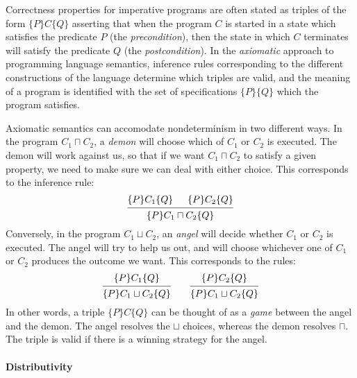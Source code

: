 \documentclass[format=sigplan,authordraft]{acmart}
\newcommand{\htr}[3]{{ \{{#1}\} {#2} \{{#3}\} }}
\begin{document}

Correctness properties for imperative programs
are often stated as triples of the form $\{P\} C \{Q\}$
asserting that
when the program $C$ is started in a state which
satisfies the predicate $P$ (the \emph{precondition}),
then the state in which $C$ terminates
will satisfy the predicate $Q$ (the \emph{postcondition}).
In the \emph{axiomatic} approach to programming language semantics,
inference rules
corresponding to the different constructions of the language
determine which triples are valid,
and the meaning of a program is identified with
the set of specifications $\{P\}\{Q\}$
which the program satisfies.

Axiomatic semantics
can accomodate nondeterminism in two different ways.
In the program $C_1 \sqcap C_2$,
a \emph{demon} will choose which of $C_1$ or $C_2$ is executed.
The demon will work against us,
so that if we want $C_1 \sqcap C_2$ to satisfy a given property,
we need to make sure we can deal with either choice.
This corresponds to the inference rule:
\[
  \begin{prooftree}
    \hypo{\htr{P}{C_1}{Q}}
    \hypo{\htr{P}{C_2}{Q}}
    \infer2{\htr{P}{C_1 \sqcap C_2}{Q}}
  \end{prooftree}
\]
Conversely,
in the program $C_1 \sqcup C_2$,
an \emph{angel} will decide whether $C_1$ or $C_2$ is executed.
The angel will try to help us out,
and will choose whichever one of $C_1$ or $C_2$ produces
the outcome we want.
This corresponds to the rules:
\[
  \begin{prooftree}
    \hypo{\{P\} C_1 \{Q\}}
    \infer1{\{P\} C_1 \sqcup C_2 \{Q\}}
  \end{prooftree}
  \qquad
  \begin{prooftree}
    \hypo{\{P\} C_2 \{Q\}}
    \infer1{\{P\} C_1 \sqcup C_2 \{Q\}}
  \end{prooftree}
\]
In other words,
a triple $\htr{P}{C}{Q}$
can be thought of as a \emph{game}
between the angel and the demon.
The angel resolves the $\sqcup$ choices,
whereas the demon resolves $\sqcap$.
The triple is valid if there is a winning strategy
for the angel.


\paragraph{Distributivity} %
\end{document}
